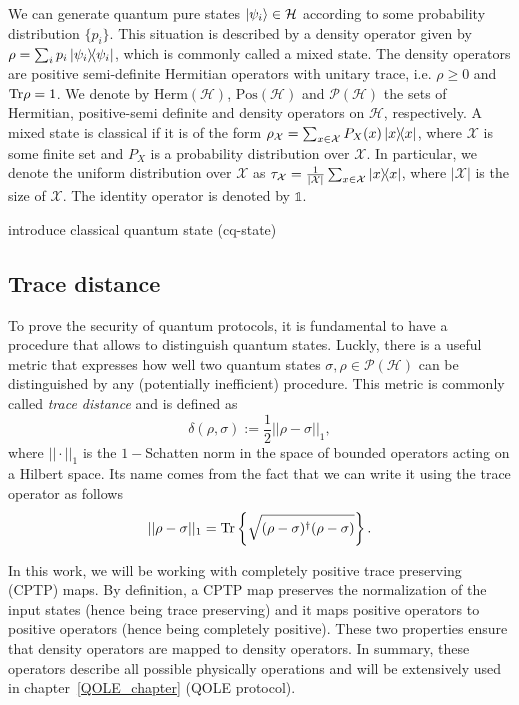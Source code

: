 We can generate quantum pure states $| \psi_i \rangle\in \mathcal{H}$ according to some probability distribution $\{p_i\}$. This situation is described by a density operator given by $\rho = \sum_i p_i \ketbra{\psi_i}$, which is commonly called a mixed state. The density operators are positive semi-definite Hermitian operators with unitary trace, i.e. $\rho \geq 0$ and $\text{Tr} \rho = 1$. We denote by $\text{Herm}(\mathcal{H})$, $\text{Pos}(\mathcal{H})$  and $\mathcal{P}(\mathcal{H})$ the sets of Hermitian, positive-semi definite and density operators on $\mathcal{H}$, respectively.
A mixed state is classical if it is of the form $\rho_{\mathcal{X}} = \sum_{x\in\mathcal{X}} P_X(x)\ketbra{x}$, where $\mathcal{X}$ is some finite set and $P_X$ is a probability distribution over $\mathcal{X}$. In particular, we denote the uniform distribution over $\mathcal{X}$ as $\tau_{\mathcal{X}} = \frac{1}{|\mathcal{X}|}\sum_{x\in\mathcal{X}}\ketbra{x}$, where $|\mathcal{X}|$ is the size of $\mathcal{X}$. The identity operator is denoted by $\mathds{1}$. 

{\cv introduce classical quantum state (cq-state)}


\subsection{Trace distance}

To prove the security of quantum protocols, it is fundamental to have a procedure that allows to distinguish quantum states. Luckly, there is a useful metric that expresses how well two quantum states $\sigma, \rho \in \mathcal{P}(\mathcal{H})$ can be distinguished by any (potentially inefficient) procedure. This metric is commonly called \textit{trace distance} and is defined as \cite{U17}
\begin{equation*}
    \delta(\rho,\sigma):=\frac{1}{2}||\rho-\sigma||_1,
\end{equation*}
where $||\cdot||_1$ is the $1-$Schatten norm in the space of bounded operators acting on a Hilbert space. Its name comes from the fact that we can write it using the trace operator as follows
\begin{equation*}
    ||\rho-\sigma||_1=\Tr\left\{\sqrt{(\rho-\sigma)^\dagger(\rho-\sigma)}\right\}.
\end{equation*}

In this work, we will be working with completely positive trace preserving (CPTP) maps. By definition, a CPTP map preserves the normalization of the input states (hence being trace preserving) and it maps positive operators to positive operators (hence being completely positive). These two properties ensure that density operators are mapped to density operators. In summary, these operators describe all possible physically operations and will be extensively used in chapter~\ref{QOLE_chapter} (QOLE protocol). 

